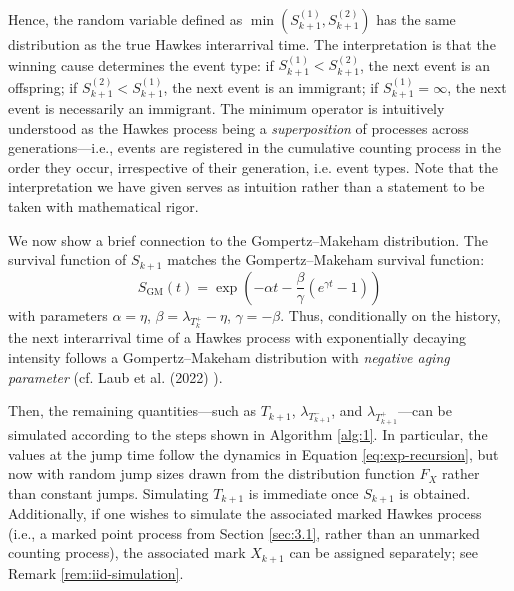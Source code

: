 \documentclass[12pt,a4paper]{report}
\theoremstyle{plain}
\theoremstyle{definition}
\theoremstyle{remark}
\newcommand{\1}{\mathbf{1}}
\begin{document}
\noindent
Hence, the random variable defined as \(\min(S_{k+1}^{(1)}, S_{k+1}^{(2)})\) has the same distribution as the true Hawkes interarrival time. The interpretation is that the winning cause determines the event type: if \(S_{k+1}^{(1)} < S_{k+1}^{(2)}\), the next event is an offspring; if \(S_{k+1}^{(2)} < S_{k+1}^{(1)}\), the next event is an immigrant; if \(S_{k+1}^{(1)} = \infty\), the next event is necessarily an immigrant. The minimum operator is intuitively understood as the Hawkes process being a \emph{superposition} of processes across generations—i.e., events are registered in the cumulative counting process in the order they occur, irrespective of their generation, i.e. event types. Note that the interpretation we have given serves as intuition rather than a statement to be taken with mathematical rigor.

\medskip
\noindent
We now show a brief connection to the Gompertz--Makeham distribution. The survival function of \(S_{k+1}\) matches the Gompertz--Makeham survival function:
\[
S_{\mathrm{GM}}(t) = \exp\left( -\alpha t - \frac{\beta}{\gamma}(e^{\gamma t} - 1) \right)
\]
with parameters \(\alpha = \eta\), \(\beta = \lambda_{T_k^+} - \eta\), \(\gamma = -\beta\). Thus, conditionally on the history, the next interarrival time of a Hawkes process with exponentially decaying intensity follows a Gompertz--Makeham distribution with \emph{negative aging parameter} \cite{Gom25,Mak60} (cf. Laub et al. (2022) \cite{LLT22}).

\medskip
\noindent
Then, the remaining quantities—such as $T_{k+1}$, $\lambda_{T_{k+1}^-}$, and $\lambda_{T_{k+1}^+}$—can be simulated according to the steps shown in Algorithm \ref{alg:1}. In particular, the values at the jump time follow the dynamics in Equation \eqref{eq:exp-recursion}, but now with random jump sizes drawn from the distribution function $F_X$ rather than constant jumps. Simulating $T_{k+1}$ is immediate once $S_{k+1}$ is obtained. Additionally, if one wishes to simulate the associated marked Hawkes process (i.e., a marked point process from Section \ref{sec:3.1}, rather than an unmarked counting process), the associated mark $X_{k+1}$ can be assigned separately; see Remark \ref{rem:iid-simulation}.
\end{document}
